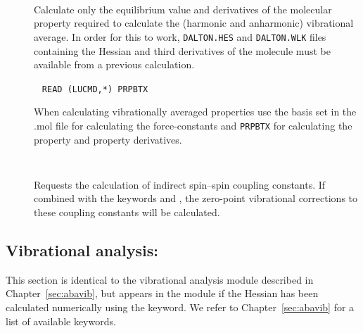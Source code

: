 \begin{description}
\item[]\verb| |\newline

Calculate only the equilibrium value and derivatives of the molecular property
required to calculate the (harmonic and anharmonic) vibrational average. 
In order for this to work, \verb|DALTON.HES| and \verb|DALTON.WLK| files containing the Hessian 
and third derivatives of the molecule must be available from a previous calculation.

\item[]\verb| |\newline
\verb|READ (LUCMD,*) PRPBTX|

When calculating vibrationally averaged properties use the basis set in the 
.mol file for calculating the force-constants and \verb|PRPBTX| for 
calculating the property and property derivatives.

\item[]\verb| |\newline

Requests the calculation of indirect spin--spin coupling constants.
If combined with the keywords  and , the
zero-point vibrational corrections to these coupling constants will be
calculated.

\end{description}

\subsection{Vibrational analysis: }
\label{sec:nmddrv.vibana}

This section is identical to the vibrational analysis module described
in Chapter~\ref{sec:abavib}, but appears in the  module
if the Hessian has been calculated numerically using the 
keyword. We refer to Chapter~\ref{sec:abavib} for a list of available
keywords.
